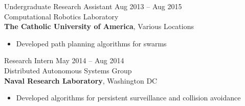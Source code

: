 \documentclass[line,margin]{cv}
\begin{document}
\begin{resume}
\begin{itemize}
\end{itemize}

Undergraduate Research Assistant
\hfill Aug 2013 -- Aug 2015 \\
Computational Robotics Laboratory \\
\textbf{The Catholic University of America}, Various Locations
\begin{itemize}

    \item Developed path planning algorithms for swarms

\end{itemize}

%
%
%


Research Intern
\hfill May 2014 -- Aug 2014 \\
Distributed Autonomous Systems Group\\
\textbf{Naval Research Laboratory}, Washington DC
\begin{itemize}

    \item Developed algorithms for persistent surveillance and
        collision avoidance

\end{itemize}

%
%
%
%

%
%


\end{resume}
\end{document}
